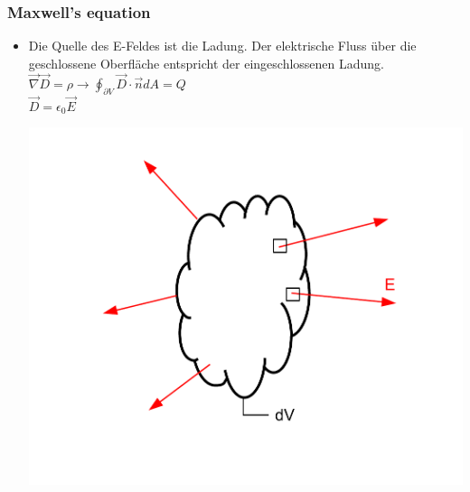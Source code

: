 \documentclass[a4paper, 10pt]{scrartcl}
\begin{document}
\subsubsection{Maxwell's equation}
\begin{itemize}
	
	\item Die Quelle des E-Feldes ist die Ladung. Der elektrische Fluss über die
	geschlossene Oberfläche entspricht der eingeschlossenen Ladung.\\
	$ \vec \nabla \vec D = \rho \rightarrow \oint_{\partial V} \vec D \cdot \vec n
	dA = Q$\\
	$\vec D = \epsilon_0 \vec E$\\
	
	\begin{center}
		\includegraphics[scale=0.5]{images/maxwell_1.pdf}
	\end{center}
	

\end{itemize}
\end{document}
